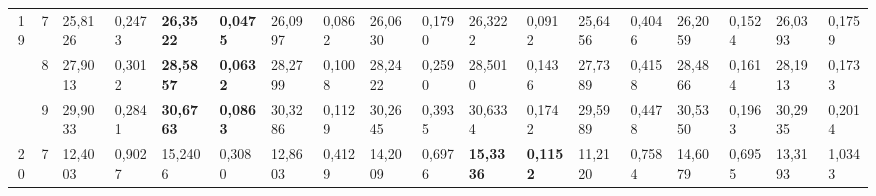 \documentclass[conference]{IEEEtran}
\begin{document}
\begin{table*}[]
\begin{tabular}{|cc|ll|ll|ll|ll|ll|ll|ll|ll|}
		\multicolumn{1}{|c|}{\multirow{3}{*}{19}} & 7          & \multicolumn{1}{l|}{25,8126}           & 0,2473                            & \multicolumn{1}{l|}{\textbf{26,3522}}  & \textbf{0,0475}                   & \multicolumn{1}{l|}{26,0997}           & 0,0862                            & \multicolumn{1}{l|}{26,0630}           & 0,1790                            & \multicolumn{1}{l|}{26,3222}           & 0,0912                            & \multicolumn{1}{l|}{25,6456}           & 0,4046                            & \multicolumn{1}{l|}{26,2059}           & 0,1524                            & \multicolumn{1}{l|}{26,0393}           & 0,1759                            \\ \cline{2-18} 
		\multicolumn{1}{|c|}{}                    & 8          & \multicolumn{1}{l|}{27,9013}           & 0,3012                            & \multicolumn{1}{l|}{\textbf{28,5857}}  & \textbf{0,0632}                   & \multicolumn{1}{l|}{28,2799}           & 0,1008                            & \multicolumn{1}{l|}{28,2422}           & 0,2590                            & \multicolumn{1}{l|}{28,5010}           & 0,1436                            & \multicolumn{1}{l|}{27,7389}           & 0,4158                            & \multicolumn{1}{l|}{28,4866}           & 0,1614                            & \multicolumn{1}{l|}{28,1913}           & 0,1733                            \\ \cline{2-18} 
		\multicolumn{1}{|c|}{}                    & 9          & \multicolumn{1}{l|}{29,9033}           & 0,2841                            & \multicolumn{1}{l|}{\textbf{30,6763}}  & \textbf{0,0863}                   & \multicolumn{1}{l|}{30,3286}           & 0,1129                            & \multicolumn{1}{l|}{30,2645}           & 0,3935                            & \multicolumn{1}{l|}{30,6334}           & 0,1742                            & \multicolumn{1}{l|}{29,5989}           & 0,4478                            & \multicolumn{1}{l|}{30,5350}           & 0,1963                            & \multicolumn{1}{l|}{30,2935}           & 0,2014                            \\ \hline
		\multicolumn{1}{|c|}{\multirow{3}{*}{20}} & 7          & \multicolumn{1}{l|}{12,4003}           & 0,9027                            & \multicolumn{1}{l|}{15,2406}           & 0,3080                            & \multicolumn{1}{l|}{12,8603}           & 0,4129                            & \multicolumn{1}{l|}{14,2009}           & 0,6976                            & \multicolumn{1}{l|}{\textbf{15,3336}}  & \textbf{0,1152}                   & \multicolumn{1}{l|}{11,2120}           & 0,7584                            & \multicolumn{1}{l|}{14,6079}           & 0,6955                            & \multicolumn{1}{l|}{13,3193}           & 1,0343                            \\ \cline{2-18} 

\end{tabular}
\end{table*}
\end{document}
